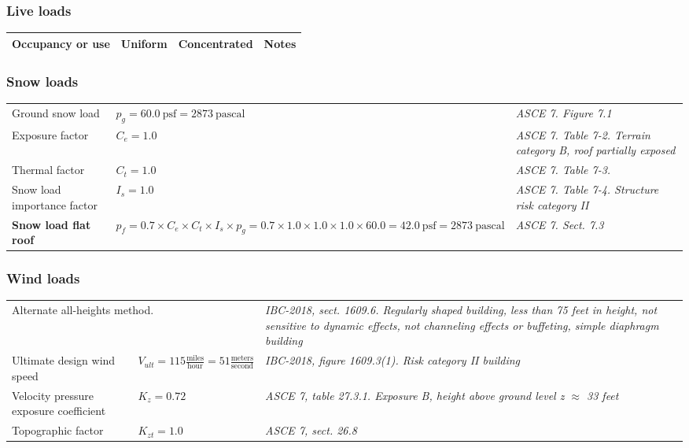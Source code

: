 \subsubsection{Live loads}
\begin{tabular}{p{5cm}p{2.5cm}|p{2.5cm}|p{4cm}}
\textbf{Occupancy or use} & \textbf{Uniform} & \textbf{Concentrated} & \textbf{Notes}\\
\hline

\end{tabular}

\subsubsection{Snow loads}
\begin{tabular}{p{5cm}p{5cm}|p{5cm}}
Ground snow load & $p_g = 60.0\ \mathrm{psf} = 2873 \ \mathrm{pascal}$ & \emph{ASCE 7. Figure 7.1}\\
Exposure factor & $C_e = 1.0$ &  \emph{ASCE 7. Table 7-2. Terrain category B, roof partially exposed} \\
Thermal factor &  $C_t = 1.0$ & \emph{ASCE 7. Table 7-3.}\\
Snow load importance factor & $I_s = 1.0$ & \emph{ASCE 7. Table 7-4. Structure risk category II}\\
\textbf{Snow load flat roof} & $p_f = 0.7 \times C_e \times C_t \times  I_s\times p_g = 0.7 \times 1.0 \times 1.0 \times 1.0 \times 60.0 = 42.0\ \mathrm{psf} = 2873 \ \mathrm{pascal}$ & \emph{ASCE 7. Sect. 7.3}\\
\end{tabular}

\subsubsection{Wind loads}
\begin{tabular}{p{5cm}l|p{5cm}}
\multicolumn{2}{l|}{Alternate all-heights method.} & \emph{IBC-2018, sect. 1609.6.  Regularly shaped building, less than 75 feet in height, not sensitive to dynamic effects, not channeling effects or buffeting, simple diaphragm building} \\
Ultimate design wind speed & $V_{ult} = 115 \frac{\mathrm{miles}}{\mathrm{hour}} = 51 \frac{\mathrm{meters}}{\mathrm{second}} $& \emph{IBC-2018, figure 1609.3(1). Risk category II building}\\
Velocity pressure exposure coefficient & $K_z = 0.72$ & \emph{ASCE 7, table 27.3.1. Exposure B, height above ground level z $\approx$ 33 feet} \\
Topographic factor & $K_{zt} = 1.0 $ & \emph{ASCE 7, sect. 26.8} \\
\end{tabular}

